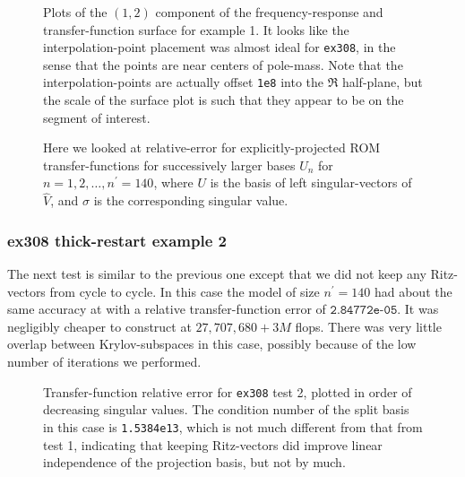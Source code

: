 \begin{figure}
\centering
{}
\caption{\label{fig:308test1_tfunc} Plots of the $(1,2)$ component of the frequency-response and transfer-function surface for example 1.  It looks like the interpolation-point placement was almost ideal for \texttt{ex308}, in the sense that the points are near centers of pole-mass.   Note that the interpolation-points are actually offset \texttt{1e8} into the $\Re$ half-plane, but the scale of the surface plot is such that they appear to be on the segment of interest.    }
\end{figure}

\begin{figure}
\centering
{}
\caption{Here we looked at relative-error for explicitly-projected ROM transfer-functions for successively larger bases $U_n$ for $n=1,2,\ldots,n^\prime = 140$, 
where $U$ is the basis of left singular-vectors of $\widehat{V}$, and $\sigma$ is the corresponding singular value.
}
\end{figure}


\clearpage
\subsubsection{ex308 thick-restart example 2}
The next test is similar to the previous one except that we did not keep any Ritz-vectors from cycle to cycle.   In this case the model  of size $n^\prime = 140$ had about the same accuracy at  with a relative transfer-function error of $\texttt{2.84772e-05}$.  It was negligibly cheaper to construct at $27,707,680 + 3M$ flops.   There was very little overlap between Krylov-subspaces in this case, possibly because of the low number of iterations we performed.    
\begin{figure}
\centering
{}
\caption{\label{fig:308_test2_svd3} Transfer-function relative error for \texttt{ex308} test 2,  plotted in order of decreasing singular values.  The condition number of the split basis in this case is \texttt{1.5384e13}, which is not much different from that from test 1, indicating that keeping Ritz-vectors did improve linear independence of the projection basis, but not by much.  }
\end{figure}

